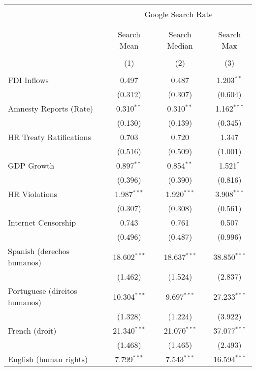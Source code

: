 
\begin{table}[!htbp] \centering 
  \caption{} 
  \label{} 
\begin{tabular}{@{\extracolsep{5pt}}lccc} 
\\[-1.8ex]\hline 
\hline \\[-1.8ex] 
 & \multicolumn{3}{c}{Google Search Rate} \\ 
\cline{2-4} 
\\[-1.8ex] & \multicolumn{3}{c}{ } \\ 
 & Search Mean & Search Median & Search Max \\ 
\\[-1.8ex] & (1) & (2) & (3)\\ 
\hline \\[-1.8ex] 
 FDI Inflows & 0.497 & 0.487 & 1.203$^{**}$ \\ 
  & (0.312) & (0.307) & (0.604) \\ 
  Amnesty Reports (Rate) & 0.310$^{**}$ & 0.310$^{**}$ & 1.162$^{***}$ \\ 
  & (0.130) & (0.139) & (0.345) \\ 
  HR Treaty Ratifications & 0.703 & 0.720 & 1.347 \\ 
  & (0.516) & (0.509) & (1.001) \\ 
  GDP Growth & 0.897$^{**}$ & 0.854$^{**}$ & 1.521$^{*}$ \\ 
  & (0.396) & (0.390) & (0.816) \\ 
  HR Violations & 1.987$^{***}$ & 1.920$^{***}$ & 3.908$^{***}$ \\ 
  & (0.307) & (0.308) & (0.561) \\ 
  Internet Censorship & 0.743 & 0.761 & 0.507 \\ 
  & (0.496) & (0.487) & (0.996) \\ 
  Spanish (derechos humanos) & 18.602$^{***}$ & 18.637$^{***}$ & 38.850$^{***}$ \\ 
  & (1.462) & (1.524) & (2.837) \\ 
  Portuguese (direitos humanos) & 10.304$^{***}$ & 9.697$^{***}$ & 27.233$^{***}$ \\ 
  & (1.328) & (1.224) & (3.922) \\ 
  French (droit) & 21.340$^{***}$ & 21.070$^{***}$ & 37.077$^{***}$ \\ 
  & (1.468) & (1.465) & (2.493) \\ 
  English (human rights) & 7.799$^{***}$ & 7.543$^{***}$ & 16.594$^{***}$ \\ 

\end{tabular}
\end{table}
